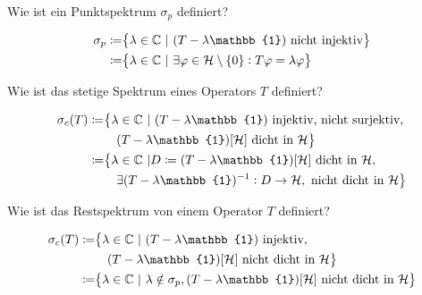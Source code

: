 \documentclass[9pt]{article}
\newcommand{\C}[1]{%
	\ifthenelse{\equal{#1}{}}
	{\mathbb{C}}
	{\mathbb{C}^{#1}}}%
\newcommand{\Hi}{\mathcal{H}}
\newcommand{\id}{\mathbb{1}}
\newcommand{\inv}{^{-1}}
\newenvironment{field}{}{\newpage}
\newif\ifnote
\newenvironment{note}{\notetrue}{\notefalse}
\newcommand{\localtag}{}
\newcommand{\globaltag}{}
\newcommand{\uuid}{}
\newcommand{\tags}[1]{
    \ifnote 
        \renewcommand{\localtag}{#1}
    \else
        \renewcommand{\globaltag}{#1}
    \fi 
    }
\newcommand{\xplain}[1]{\renewcommand{\uuid}{#1}}
\begin{document}
	\begin{note}
		\xplain{471d3474-c216-46e9-b61c-097278aa2327}
		\tags{6.3.5}
		
		\begin{field}  %
			Wie ist ein Punktspektrum $\sigma_p$ definiert?
		\end{field}
		
		\begin{field}  %
			\begin{align*}
				\sigma_p \coloneqq& \qty{\lambda \in \C{} \ | \ (T-\lambda\id) \text{ nicht injektiv}} \\
						 \coloneqq& \qty{\lambda \in \C{} \ | \ \exists \varphi \in \Hi\setminus \qty{0}: T\varphi = \lambda \varphi} 
			\end{align*}
		\end{field}
			
		\begin{field}  %
			Wie ist das stetige Spektrum eines Operators $T$ definiert?
		\end{field}
		
		\begin{field}  %
			\begin{align*}
				\sigma_c(T) \coloneqq& \big\{\lambda \in \C{} \ | \ (T-\lambda \id) \text{ injektiv, nicht surjektiv, } \\
										    &\quad(T-\lambda\id)[\Hi] \text{ dicht in } \Hi\big\} \\
							\coloneqq& \big\{ \lambda \in \C{} \ | D\coloneqq (T-\lambda\id)[\Hi] \text{ dicht in } \Hi, \\
											&\quad\exists(T-\lambda\id)\inv : D \rightarrow \Hi,  \text{ nicht dicht in } \Hi \big\}
			\end{align*}
		\end{field}
			
		\begin{field}  %
			Wie ist das Restspektrum von einem Operator $T$ definiert?
		\end{field}
		
		\begin{field}  %
			\begin{align*}
			\sigma_c(T) \coloneqq& \big\{\lambda \in \C{} \ | \ (T-\lambda \id) \text{ injektiv, } \\
			&\quad(T-\lambda\id)[\Hi] \text{ nicht dicht in } \Hi\big\} \\
			\coloneqq& \qty{\lambda \in \C{} \ | \ \lambda \notin \sigma_p, (T-\lambda\id)[\Hi] \text{ nicht dicht in }
				\Hi}
			\end{align*}
		\end{field}
	\end{note}
\end{document}
